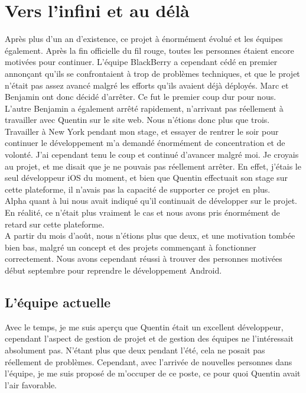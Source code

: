 \documentclass{article}
\begin{document}
\section{Vers l'infini et au délà}
	Après plus d'un an d'existence, ce projet à énormément évolué et les équipes également. Après la fin officielle du fil rouge, toutes les personnes étaient encore motivées pour continuer. L'équipe BlackBerry a cependant cédé en premier annonçant qu'ils se confrontaient à trop de problèmes techniques, et que le projet n'était pas assez avancé malgré les efforts qu'ils avaient déjà déployés. Marc et Benjamin ont donc décidé d'arrêter. Ce fut le premier coup dur pour nous. L'autre Benjamin a également arrêté rapidement, n'arrivant pas réellement à travailler avec Quentin sur le site web. Nous n'étions donc plus que trois. \\
	
	Travailler à New York pendant mon stage, et essayer de rentrer le soir pour continuer le développement m'a demandé énormément de concentration et de volonté. J'ai cependant tenu le coup et continué d'avancer malgré moi. Je croyais au projet, et me disait que je ne pouvais pas réellement arrêter. En effet, j'étais le seul développeur iOS du moment, et bien que Quentin effectuait son stage sur cette plateforme, il n'avais pas la capacité de supporter ce projet en plus. \\
	
	Alpha quant  à lui nous avait indiqué qu'il continuait de développer sur le projet. En réalité, ce n'était plus vraiment le cas et nous avons pris énormément de retard sur cette plateforme. \\
	
	A partir du mois d'août, nous n'étions plus que deux, et une motivation tombée bien bas, malgré un concept et des projets commençant à fonctionner correctement. Nous avons cependant réussi à trouver des personnes motivées début septembre pour reprendre le développement Android. 
	\subsection{L'équipe actuelle}
	Avec le temps, je me suis aperçu que Quentin était un excellent développeur, cependant l'aspect de gestion de projet et de gestion des équipes ne l'intéressait absolument pas. N'étant plus que deux pendant l'été, cela ne posait pas réellement de problèmes. Cependant, avec l'arrivée de nouvelles personnes dans l'équipe, je me suis proposé de m'occuper de ce poste, ce pour quoi Quentin avait l'air favorable. 
\end{document}
